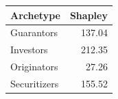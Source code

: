 \begin{tabular}{lr}
\toprule
Archetype & Shapley \\
\midrule
Guarantors & 137.04 \\
Investors & 212.35 \\
Originators & 27.26 \\
Securitizers & 155.52 \\
\bottomrule
\end{tabular}
